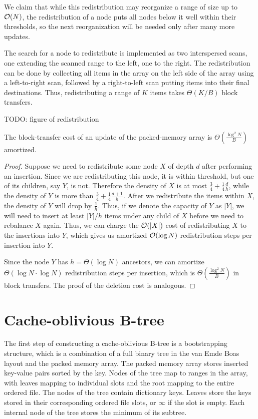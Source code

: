 We claim that while this redistribution may reorganize a range of size up
to $\mathcal{O}(N)$, the redistribution of a node puts all nodes below it well within
their thresholds, so the next reorganization will be needed only after many more
updates.

The search for a node to redistribute is implemented as two interspersed scans,
one extending the scanned range to the left, one to the right. The
redistribution can be done by collecting all items in the array on the left side
of the array using a left-to-right scan, followed by a right-to-left scan
putting items into their final destinations. Thus,
redistributing a range of $K$ items takes $\Theta(K/B)$ block transfers.

TODO: figure of redistribution

\begin{theorem}
The block-transfer cost of an update of the packed-memory array
is $\Theta(\frac{\log^2 N}{B})$ amortized.
\end{theorem}

\begin{proof}
Suppose we need to redistribute some node $X$ of depth $d$ after performing
an insertion. Since we are redistributing this node, it is within threshold,
but one of its children, say $Y$, is not.
Therefore the density of $X$ is at most
$\frac{3}{4}+\frac{1}{4}\frac{d}{h}$, while the density of $Y$ is more than
$\frac{3}{4}+\frac{1}{4}\frac{d+1}{h}$. After we redistribute the items within $X$,
the density of $Y$ will drop by $\frac{1}{h}$. Thus, if we denote the capacity
of $Y$ as $|Y|$, we will need to insert at least $|Y|/h$ items under any
child of $X$ before we need to rebalance $X$ again.
Thus, we can charge the $\mathcal{O}(|X|)$ cost of redistributing $X$ to the
insertions into $Y$, which gives us amortized $\mathcal{O}(\log N)$
redistribution steps per insertion into $Y$.

Since the node $Y$ has $h=\Theta(\log N)$ ancestors, we can amortize
$\Theta(\log N \cdot \log N)$ redistribution steps per insertion, which is
$\Theta(\frac{\log^2 N}{B})$ in block transfers. The proof of the deletion
cost is analogous.
\end{proof}

\section{Cache-oblivious B-tree}
The first step of constructing a cache-oblivious B-tree is a bootstrapping
structure, which is a combination of a full binary tree in
the van Emde Boas layout and the packed memory array.
The packed memory array stores inserted key-value pairs sorted by the key.
Nodes of the tree map to ranges in the array, with leaves mapping
to individual slots and the root mapping to the entire ordered file.
The nodes of the tree contain dictionary keys.
Leaves store the keys stored in their corresponding ordered file slots,
or $\infty$ if the slot is empty. Each internal node of the tree
stores the minimum of its subtree.

